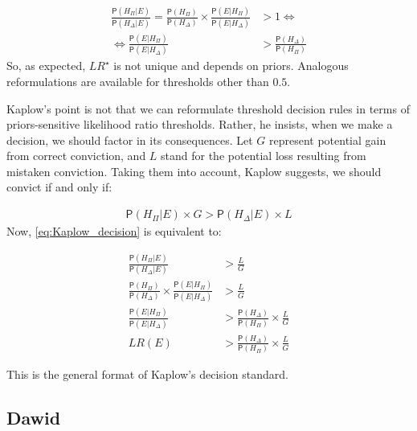 \documentclass[10pt,dvipsnames,enabledeprecatedfontcommands]{scrartcl}
\newcommand{\pr}[1]{\mathsf{P}(#1)}
\begin{document}
\vspace{-6mm}

\begin{align*}
\frac{\pr{H_\Pi\vert E}}{\pr{H_\Delta\vert E}} =  \frac{\pr{H_\Pi}}{\pr{H_\Delta}}\times \frac{\pr{E\vert H_\Pi}}{\pr{E\vert H_\Delta}} &>1 \Leftrightarrow\\
  \Leftrightarrow \frac{\pr{E\vert H_\Pi}}{\pr{E\vert H_\Delta}} &> \frac{\pr{H_\Delta}}{\pr{H_\Pi}} 
 \end{align*} \noindent So, as expected, \(LR^\star\) is not unique and
depends on priors. Analogous reformulations are available for thresholds
other than \(0.5\).

Kaplow's point is not that we can reformulate threshold decision rules
in terms of priors-sensitive likelihood ratio thresholds. Rather, he
insists, when we make a decision, we should factor in its consequences.
Let \(G\) represent potential gain from correct conviction, and \(L\)
stand for the potential loss resulting from mistaken conviction. Taking
them into account, Kaplow suggests, we should convict if and only if:

\vspace{-6mm}

\begin{align}
\label{eq:Kaplow_decision}
\pr{H_\Pi\vert E}\times G > \pr{H_\Delta\vert E}\times L
\end{align} \noindent Now, \eqref{eq:Kaplow_decision} is equivalent to:

\vspace{-6mm}

\begin{align}
\nonumber
\frac{\pr{H_\Pi \vert E}}{\pr{H_\Delta \vert E}} & > \frac{L}{G}\\
\nonumber
\frac{\pr{H_\Pi}}{\pr{H_\Delta}} \times \frac{\pr{E\vert H_\Pi}}{\pr{E\vert H_\Delta}} &> \frac{L}{G}\\
\nonumber
\frac{\pr{E\vert H_\Pi}}{\pr{E\vert H_\Delta}}  & > \frac{\pr{H_\Delta}}{\pr{H_\Pi}} \times \frac{L}{G}\\
\label{eq:Kaplow_decision2} LR(E)  & > \frac{\pr{H_\Delta}}{\pr{H_\Pi}} \times \frac{L}{G}
\end{align}

\noindent This is the general format of Kaplow's decision standard.

\hypertarget{dawid}{%
\subsection{Dawid}\label{dawid}}
\end{document}
